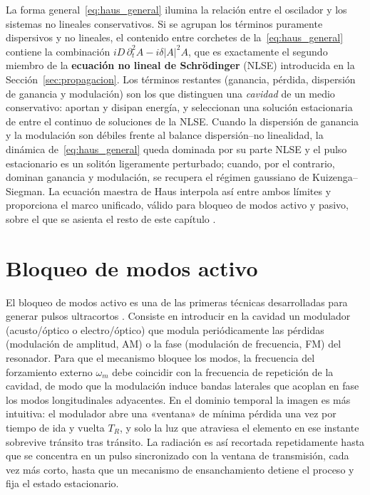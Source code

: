 La forma general~\eqref{eq:haus_general} ilumina la relación entre el oscilador y
los sistemas no lineales conservativos. Si se agrupan los términos puramente
dispersivos y no lineales, el contenido entre corchetes de
la~\eqref{eq:haus_general} contiene la combinación
$iD\,\partial_t^2 A - i\delta|A|^2 A$, que es exactamente el segundo miembro de la
\textbf{ecuación no lineal de Schrödinger} (NLSE) introducida en la
Sección~\ref{sec:propagacion}. Los términos restantes (ganancia, pérdida,
dispersión de ganancia y modulación) son los que distinguen una \emph{cavidad}
de un medio conservativo: aportan y disipan energía, y seleccionan una solución
estacionaria de entre el continuo de soluciones de la NLSE. Cuando la dispersión
de ganancia y la modulación son débiles frente al balance dispersión--no
linealidad, la dinámica de~\eqref{eq:haus_general} queda dominada por su parte
NLSE y el pulso estacionario es un solitón ligeramente perturbado; cuando, por el
contrario, dominan ganancia y modulación, se recupera el régimen gaussiano de
Kuizenga--Siegman. La ecuación maestra de Haus interpola así entre ambos límites
y proporciona el marco unificado, válido para bloqueo de modos activo y pasivo,
sobre el que se asienta el resto de este capítulo \cite{Haus2000,Keller2022}.



\section{Bloqueo de modos activo}
\label{sec:ml_activo}

El bloqueo de modos activo es una de las primeras técnicas desarrolladas para
generar pulsos ultracortos \cite{KuizengaSiegman1970,Haus1975forced}. Consiste en
introducir en la cavidad un modulador (acusto\-/óptico o electro\-/óptico) que
modula periódicamente las pérdidas (modulación de amplitud, AM) o la fase
(modulación de frecuencia, FM) del resonador. Para que el mecanismo bloquee los
modos, la frecuencia del forzamiento externo $\omega_m$ debe coincidir con la
frecuencia de repetición de la cavidad, de modo que la modulación induce bandas
laterales que acoplan en fase los modos longitudinales adyacentes. En el dominio
temporal la imagen es más intuitiva: el modulador abre una «ventana» de mínima
pérdida una vez por tiempo de ida y vuelta $T_R$, y solo la luz que atraviesa el
elemento en ese instante sobrevive tránsito tras tránsito. La radiación es así
recortada repetidamente hasta que se concentra en un pulso sincronizado con la
ventana de transmisión, cada vez más corto, hasta que un mecanismo de
ensanchamiento detiene el proceso y fija el estado estacionario.

